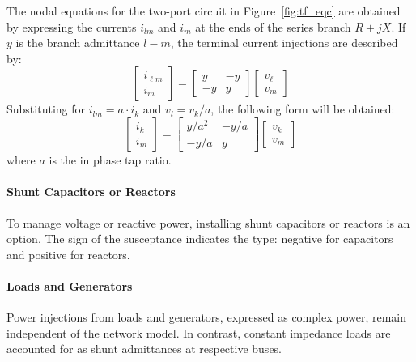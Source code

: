 The nodal equations for the two-port circuit in Figure~\cref{fig:tf_eqc} are obtained by expressing the currents $i_{lm}$ and $i_{m}$ at the ends of the series branch \(R+jX\). If $y$ is the branch admittance \(l-m\), the terminal current injections are described by:
\begin{equation}
    \left[\begin{array}{c}
i_{\ell m} \\
i_{m}
\end{array}\right]=\left[\begin{array}{rr}
y & -y \\
-y & y
\end{array}\right]\left[\begin{array}{c}
v_{\ell} \\
v_{m}
\end{array}\right]
\end{equation}
Substituting for \(i_{lm} = a \cdot i_{k}\) and \(v_{l} = v_{k}/a\), the following form will be obtained:
\begin{equation}
    \left[\begin{array}{c}
i_{k} \\
i_{m}
\end{array}\right]=\left[\begin{array}{rr}
y / a^{2} & -y / a \\
-y / a & y
\end{array}\right]\left[\begin{array}{c}
v_{k} \\
v_{m}
\end{array}\right]
\end{equation}
where $a$ is the in phase tap ratio.

\paragraph{Shunt Capacitors or Reactors}
To manage voltage or reactive power, installing shunt capacitors or reactors is an option. The sign of the susceptance indicates the type: negative for capacitors and positive for reactors.

\paragraph{Loads and Generators}
Power injections from loads and generators, expressed as complex power, remain independent of the network model. In contrast, constant impedance loads are accounted for as shunt admittances at respective buses.

